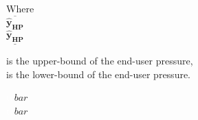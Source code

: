 \begin{minipage}[t]{0.20\textwidth}
Where\\
\hspace*{8mm} $ \overline{\bm{\hat{y}_{HP}}} $ \\
\hspace*{8mm} $ \underline{\bm{\hat{y}_{HP}}} $ 
\end{minipage}
\begin{minipage}[t]{0.68\textwidth}
\vspace*{2mm}
is the upper-bound of the end-user pressure, \\
is the lower-bound of the end-user pressure. 
\end{minipage}
\begin{minipage}[t]{0.10\textwidth}
\vspace*{1.8mm}
\textcolor{White}{te}$\unit{bar}$\\
\textcolor{White}{te}$\unit{bar}$
\end{minipage}

%



